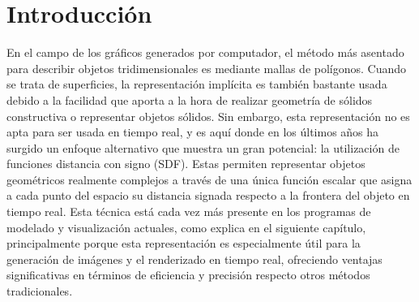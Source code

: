 %


\chapter{Introducción}\label{cap:intro}
En el campo de los gráficos generados por computador, el método más asentado para describir objetos tridimensionales es mediante mallas de polígonos. Cuando se trata de superficies, la representación implícita es también bastante usada debido a la facilidad que aporta a la hora de realizar geometría de sólidos constructiva o representar objetos sólidos. Sin embargo, esta representación no es apta para ser usada en tiempo real, y es aquí donde en los últimos años ha surgido un enfoque alternativo que muestra un gran potencial: la utilización de funciones distancia con signo (SDF). Estas permiten representar objetos geométricos realmente complejos a través de una única función escalar que asigna a cada punto del espacio su distancia signada respecto a la frontera del objeto  en tiempo real. Esta técnica está cada vez más presente en los programas de modelado y visualización actuales, como explica en el siguiente capítulo, principalmente porque esta representación es especialmente útil para la generación de imágenes y el renderizado en tiempo real, ofreciendo ventajas significativas en términos de eficiencia y precisión respecto otros métodos tradicionales.\newline

